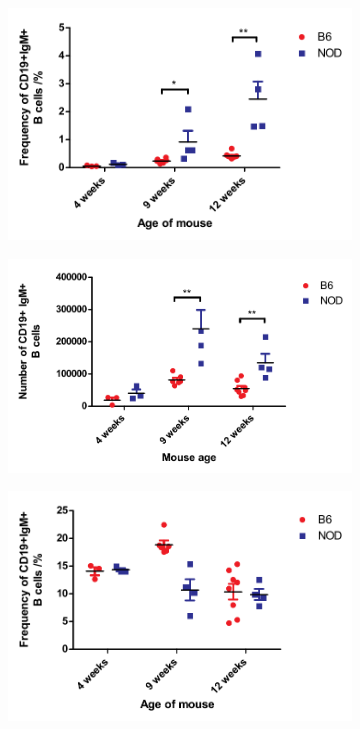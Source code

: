 \begin{figure}
	\begin{subfigure}{0.5\textwidth}
	\includegraphics[width=\textwidth]{Figures/IncthyBcells.pdf}
	\caption{}
	\label{subfig:IncthyBcells}
	\end{subfigure}
	\begin{subfigure}{0.5\textwidth}
	\includegraphics[width=\textwidth]{Figures/ThyBcellnumbers.pdf}
	\caption{}
	\label{subfig:ThyBcellnumbers}
	\end{subfigure}
	\begin{subfigure}{0.5\textwidth}
	\includegraphics[width=\textwidth]{Figures/BMBcells.pdf}

\end{subfigure}
\end{figure}
